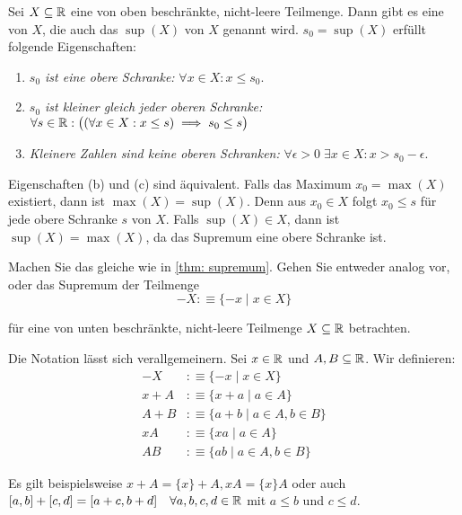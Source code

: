\begin{thm}[Supremum]
  \label{thm: supremum}
  Sei $X \subseteq \mathbb{R}$ eine von oben beschränkte, nicht-leere Teilmenge. Dann gibt es eine  von $X$, die auch das  $\operatorname{sup}(X)$ von $X$ genannt wird. $s_0 = \operatorname{sup}(X)$ erfüllt folgende Eigenschaften:
  \begin{enumerate}
    \item \emph{$s_0$ ist eine obere Schranke:} $\forall x \in X: x \leq s_0$.
    \item \emph{$s_0$ ist kleiner gleich jeder oberen Schranke:} $\forall s \in \mathbb{R}: \big((\forall x \in X: x \leq s) \implies s_0 \leq s\big)$
    \item \emph{Kleinere Zahlen sind keine oberen Schranken:} $\forall \epsilon > 0 \; \exists x \in X: x > s_0-\epsilon.$
  \end{enumerate}

  Eigenschaften (b) und (c) sind äquivalent. Falls das Maximum $x_0 = \max(X)$ existiert, dann ist $\max(X) = \sup(X)$. Denn aus $x_0 \in X$ folgt $x_0 \leq s$ für jede obere Schranke $s$ von $X$. Falls $\sup(X) \in X$, dann ist $\sup(X) = \max(X)$, da das Supremum eine obere Schranke ist.
\end{thm}

\begin{ex}
  Machen Sie das gleiche wie in \ref{thm: supremum}. Gehen Sie entweder analog vor, oder das Supremum der  Teilmenge
  \[
    -X :\equiv \{ -x \mid x \in X \}
  \]

  für eine von unten beschränkte, nicht-leere Teilmenge $X \subseteq \mathbb{R}$ betrachten.
\end{ex}

\begin{mydef-non}[Notation]
  Die Notation lässt sich verallgemeinern. Sei $x \in \mathbb{R}$ und $A,B \subseteq \mathbb{R}$. Wir definieren:
  \[
  \begin{aligned}
    -X &:\equiv \{ -x \mid x \in X \} \\
    x+A &:\equiv \{ x+a \mid a \in A \} \\
    A + B &:\equiv \{a + b \mid a \in A, b \in B \} \\
    xA &:\equiv \{xa \mid a \in A \} \\
    AB &:\equiv \{ab \mid a \in A, b \in B \}
  \end{aligned}
  \]

  Es gilt beispielsweise $x+A = \{x\}+A, xA=\{x\}A$ oder auch $[a,b]+[c,d] = [a+c, b+d] \quad \forall a,b,c,d \in \mathbb{R}$ mit $a \leq b$ und $c \leq d$.
\end{mydef-non}

